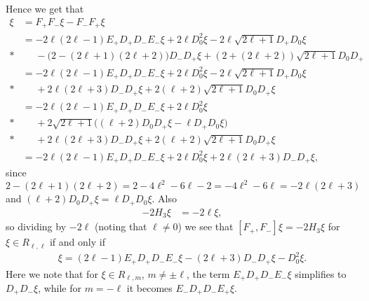 Hence we get that
\begin{align*}
  [F_+,F_-]\xi &= F_+F_-\xi - F_-F_+ \xi \\
             &= -2\ell(2\ell-1) E_+D_+D_-E_- \xi + 2\ell D_0^2 \xi - 2\ell\sqrt{2\ell+1}D_+D_0 \xi \\*
             &\phantom{{}={}}{} - \bigl(2-(2\ell+1)(2\ell+2)\bigr) D_-D_+\xi + (2+(2\ell+2))\sqrt{2\ell+1}D_0D_+ \\
             &= -2\ell(2\ell-1) E_+D_+D_-E_- \xi + 2\ell D_0^2 \xi - 2\ell\sqrt{2\ell+1}D_+D_0 \xi \\*
             &\phantom{{}={}}{} + 2\ell(2\ell+3) D_-D_+\xi + 2(\ell+2)\sqrt{2\ell+1}D_0D_+\xi \\
             &= -2\ell(2\ell-1) E_+D_+D_-E_- \xi + 2\ell D_0^2 \xi \\*
             &\phantom{{}={}}{} + 2\sqrt{2\ell+1}\bigl((\ell+2)D_0D_+\xi -\ell D_+D_0 \xi \bigr) \\*
             &\phantom{{}={}}{} + 2\ell(2\ell+3) D_-D_+\xi + 2(\ell+2)\sqrt{2\ell+1}D_0D_+\xi \\
             &= -2\ell(2\ell-1) E_+D_+D_-E_- \xi + 2\ell D_0^2 \xi + 2\ell(2\ell+3) D_-D_+\xi,
\end{align*}
since $2-(2\ell+1)(2\ell+2)=2-4\ell^2-6\ell-2=-4\ell^2-6\ell=-2\ell(2\ell+3)$ and $(\ell+2)D_0D_+ \xi = \ell D_+D_0 \xi$. Also
\begin{align*}
  -2H_3 \xi &= -2\ell \xi,
\end{align*}
so dividing by $-2\ell$ (noting that $\ell\neq 0$) we see that $[F_+,F_-]\xi = -2H_3 \xi$ for $\xi \in R_{\ell,\ell}$ if and only if
\begin{align*}
  \xi = (2\ell-1)E_+D_+D_-E_- \xi - (2\ell+3)D_-D_+ \xi - D_0^2 \xi.
\end{align*}
Here we note that for $\xi \in R_{\ell,m}$, $m\neq\pm \ell$, the term $E_+D_+D_-E_-\xi$ simplifies to $D_+D_-\xi$, while for $m=-\ell$ it becomes $E_-D_+D_-E_+\xi$. 


